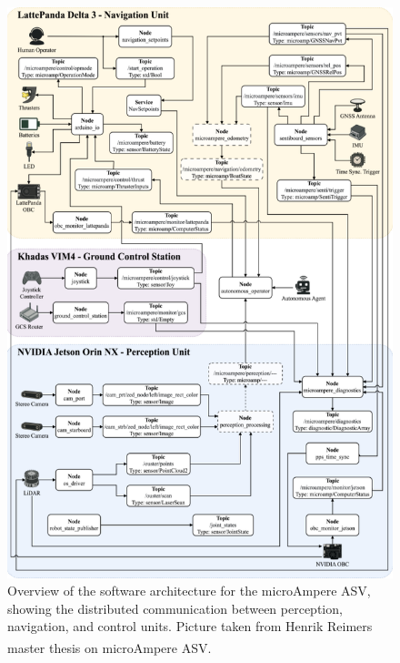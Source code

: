 \newpage

\begin{figure}[H]
    \centering
    \includegraphics[width=1.0\linewidth]{Pictures/Hardware/Software_Architecture/Overview.png}
    \caption{Overview of the software architecture for the microAmpere ASV, showing the distributed communication between perception, navigation, and control units. Picture taken from Henrik Reimers master thesis on microAmpere ASV.\textsuperscript{\cite{microAmpere_hardware_master_thesis1}}}
    \label{fig:microAmpere-software-architecture-overview}
\end{figure}